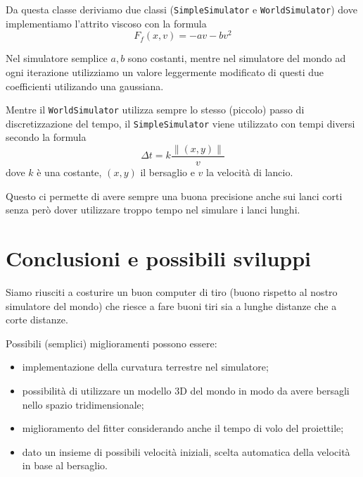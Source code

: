 \documentclass[a4paper,10pt]{article}
\newcommand{\pa}[1]{\left(#1\right)}
\newcommand{\norm}[1]{\left\|#1\right\|}
\begin{document}
Da questa classe deriviamo due classi (\verb+SimpleSimulator+ e
\verb+WorldSimulator+) dove implementiamo l'attrito viscoso con la
formula
\[ F_{f}(x,v) = -av - bv^2 \]

Nel simulatore semplice $a,b$ sono costanti, mentre nel simulatore del
mondo ad ogni iterazione utilizziamo un valore leggermente modificato
di questi due coefficienti utilizando una gaussiana.

Mentre il \verb+WorldSimulator+ utilizza sempre lo stesso (piccolo)
passo di discretizzazione del tempo, il \verb+SimpleSimulator+ viene
utilizzato con tempi diversi secondo la formula
\[ \Delta t = k\frac{\norm{\pa{x,y}}}{v} \]
dove $k$ \`e una costante, $\pa{x,y}$ il bersaglio e $v$ la velocit\`a
di lancio.

Questo ci permette di avere sempre una buona precisione anche sui
lanci corti senza per\`o dover utilizzare troppo tempo nel simulare i
lanci lunghi.

\section{Conclusioni e possibili sviluppi}

Siamo riusciti a costurire un buon computer di tiro (buono rispetto al
nostro simulatore del mondo) che riesce a fare buoni tiri sia a lunghe
distanze che a corte distanze.

Possibili (semplici) miglioramenti possono essere:
\begin{itemize}
\item implementazione della curvatura terrestre nel simulatore;
\item possibilit\`a di utilizzare un modello 3D del mondo in modo da
  avere bersagli nello spazio tridimensionale;
\item miglioramento del fitter considerando anche il tempo di volo del
  proiettile;
\item dato un insieme di possibili velocit\`a iniziali, scelta
  automatica della velocit\`a in base al bersaglio.
\end{itemize}
\end{document}
